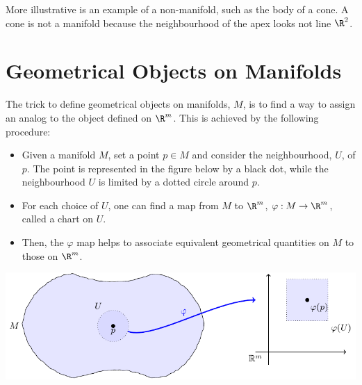 More illustrative is an example of a non-manifold, such as the body of a cone. A cone is not a manifold because the neighbourhood of the apex looks not line $\R^2$.
\begin{center}
\end{center}

\section{Geometrical Objects on Manifolds}

The trick to define geometrical objects on  manifolds, $M$, is to find a way to assign an analog to the object defined on $\R^m$. This is achieved by the following procedure:
\begin{itemize}
\item Given a manifold $M$, set a point $p\in M$ and consider the neighbourhood, $U$, of $p$. The point is represented in the figure below by a black dot, while the neighbourhood $U$ is limited by a dotted circle around $p$.
\item For each choice of $U$, one can find a map from $M$ to $\R^m$, $\varphi:M\to \R^m$, called a chart on $U$.
\item Then, the $\varphi$ map helps to associate equivalent geometrical quantities on $M$ to those on $\R^m$.
\end{itemize}
\begin{center}
  \includegraphics[scale=1.1]{Pictures/tikz-manifold.pdf}
\end{center}


